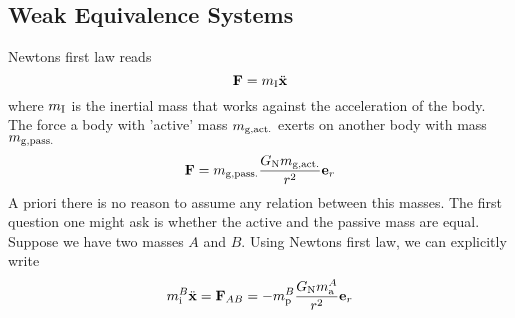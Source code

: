 \subsection*{Weak Equivalence Systems}
Newtons first law reads
\begin{equation}
    \vec{F}=m\textsubscript{I}\ddot{\vec{x}}
\end{equation}
where $m\textsubscript{I}$ is the inertial mass that works against the acceleration of the body.
The force a body with 'active' mass $m\textsubscript{g,act.}$ exerts on another
body with mass $m\textsubscript{g,pass.}$
\begin{equation}
    \vec{F}=m\textsubscript{g,pass.}\frac{G\textsubscript{N}m\textsubscript{g,act.}}{r^2}\vec{e}_r
\end{equation}
A priori there is no reason to assume any relation between this masses. The first question one might ask is whether the active and the passive mass are equal. Suppose we have two masses $A$ and $B$. Using Newtons first law, we can explicitly write
\begin{equation}
    m^{B}_{\text{i}}\ddot{\vec{x}}=\vec{F}_{AB}=-	m^{B}_{\text{p}}\frac{G\textsubscript{N}m^{A}_{\text{a}}}{r^2}\vec{e}_r
\end{equation}
